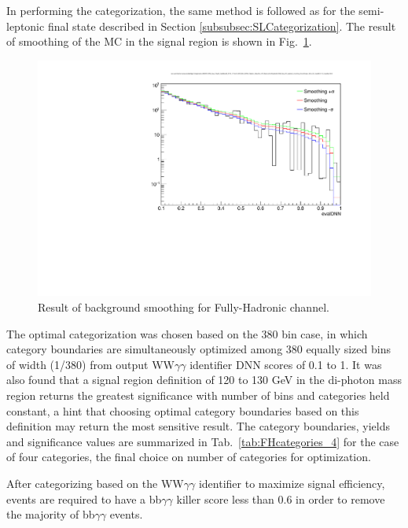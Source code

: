 In performing the categorization, the same method is followed as for the semi-leptonic final state described in Section \ref{subsubsec:SLCategorization}. The result of smoothing of the MC in the signal region is shown in Fig.~\ref{fig:FH_smoothing}.

\begin{figure}[!htbp]
  \centering
  \includegraphics[scale=0.6]{Sections/HHWWgg/images/FH_DNN/h_DNN_bkg_SR_weighted_smoothing_SmoothSuper_nBins_50_massMin121_0_massMax129_0.pdf}
  \caption{Result of background smoothing for Fully-Hadronic channel.}
  \label{fig:FH_smoothing}
\end{figure}

The optimal categorization was chosen based on the 380 bin case, in which category boundaries are simultaneously optimized among 380 equally sized bins of width (1/380) from output WW$\gamma\gamma$ identifier DNN scores of 0.1 to 1.
It was also found that a signal region definition of 120 to 130 GeV in the di-photon mass region returns the greatest significance with number of bins and categories held constant,
a hint that choosing optimal category boundaries based on this definition may return the most sensitive result.
The category boundaries, yields and significance values are summarized in Tab.~\ref{tab:FHcategories_4} for the case of four categories, the final choice on number of categories for optimization.

After categorizing based on the WW$\gamma\gamma$ identifier to maximize signal efficiency, events are required to have a bb$\gamma\gamma$ killer score less than 0.6 in order to remove the majority of bb$\gamma\gamma$ events.

